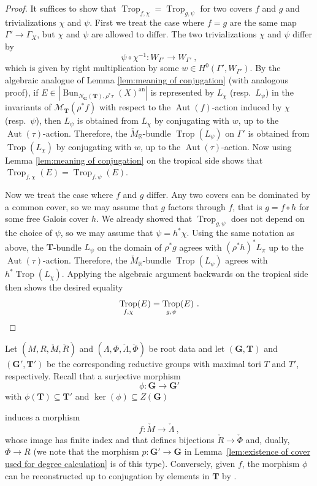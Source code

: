 \documentclass[10pt, a4paper]{amsart}
\theoremstyle{definition}
\theoremstyle{myitemstyle}
\newcommand{\R}{\mathbb{R}}
\newcommand{\Mcheck}{{\check{M}}}
\newcommand{\Lambdacheck}{\check{\Lambda}}
\newcommand{\Rcheck}{\check{R}}
\newcommand{\Phicheck}{\check{\Phi}}
\newcommand{\bfG}{\mathbf{G}}
\newcommand{\bfT}{\mathbf{T}}
\newcommand{\mc}[1]{{\mathcal{#1}}}
\DeclareMathOperator{\Aut}{Aut}
\DeclareMathOperator{\Trop}{Trop}
\DeclareMathOperator{\Bun}{Bun}
\newcommand{\an}{\mathrm{an}}
\begin{document}
\begin{proof}
It suffices to show that $\Trop_{f,\chi}=\Trop_{g,\psi}$ for two covers $f$ and $g$ and trivializations $\chi$ and $\psi$. First we treat the case where $f=g$ are the same map $\Gamma'\to \Gamma_X$, but $\chi$ and $\psi$ are allowed to differ. The two trivializations $\chi$ and $\psi$ differ by 
\[
\psi \circ \chi^{-1} \colon W_{\Gamma'}\longrightarrow W_{\Gamma'}\ ,
\]
which is given by right multiplication by some $w\in H^0(\Gamma',W_{\Gamma'})$. By the algebraic analogue of Lemma \ref{lem:meaning of conjugation} (with analogous proof), if $E\in |\Bun_{N_\bfG(\bfT),\rho^*\tau}(X)^\an|$ is represented by $L_\chi$ (resp.\ $L_\psi$) in the invariants of $\mc M_{\bfT}(\rho^*f)$ with respect to the $\Aut(f)$-action induced by $\chi$ (resp.\ $\psi$), then $L_\psi$ is obtained from $L_\chi$ by conjugating with $w$, up to the $\Aut(\tau)$-action. Therefore, the $\Mcheck_\R$-bundle $\Trop(L_\psi)$ on $\Gamma'$ is obtained from $\Trop(L_\chi)$ by conjugating with $w$, up to the $\Aut(\tau)$-action. Now using Lemma \ref{lem:meaning of conjugation} on the tropical side shows that $\Trop_{f,\chi}(E)=\Trop_{f,\psi}(E)$.

Now we treat the case where $f$ and $g$ differ. Any two covers can be dominated by a common cover, so we may assume that $g$ factors through $f$, that is $g=f\circ h$ for some free Galois cover $h$. We already showed that $\Trop_{g,\psi}$ does not depend on the choice of $\psi$, so we may assume that $\psi=h^*\chi$. Using the same notation as above, the $\bfT$-bundle $L_\psi$ on the domain of $\rho^*g$ agrees with $(\rho^*h)^*L_\pi$ up to the $\Aut(\tau)$-action. Therefore, the $\Mcheck_\R$-bundle $\Trop(L_\psi)$ agrees with $h^*\Trop(L_\chi)$. Applying the algebraic argument backwards on the tropical side then shows the desired equality
\[
    \Trop_{f,\chi}(E)=\Trop_{g,\psi}(E) \ . \qedhere
\]
\end{proof}


Let $(M, R,  \Mcheck, \Rcheck)$ and $(\Lambda, \Phi, \Lambdacheck, \Phicheck)$ be root data and let $(\bfG,\bfT)$ and $(\bfG',\bfT')$ be the corresponding reductive groups with maximal tori $T$ and $T'$, respectively. Recall that a surjective morphism
\[
\phi\colon \bfG\longrightarrow \bfG'
\]
with $\phi(\bfT)\subseteq \bfT'$ and $\ker(\phi)\subseteq Z(\bfG)$

induces a morphism
\[
f\colon \Mcheck \longrightarrow \Lambdacheck \ ,
\]
whose image has finite index and that defines bijections $\Rcheck\to \Phicheck$ and, dually,  $\Phi\to R$ (we note that the morphism $p:\mathbf{G}'\to \mathbf{G}$ in Lemma~\ref{lem:existence of cover used for degree calculation} is of this type). Conversely, given $f$, the morphism $\phi$ can be reconstructed up to conjugation by elements in $\mathbf T$ by \cite{Steinberg}. 
\end{document}
